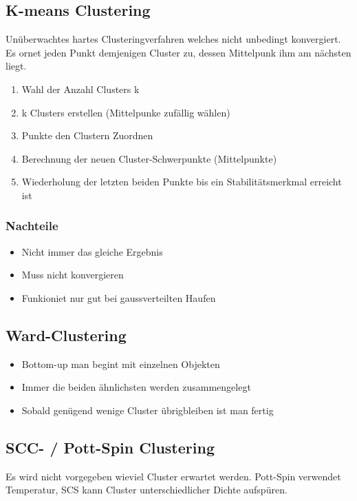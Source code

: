 \subsection{K-means Clustering}
Unüberwachtes hartes Clusteringverfahren welches nicht unbedingt konvergiert. Es ornet jeden Punkt demjenigen Cluster zu, dessen Mittelpunk ihm am nächsten liegt.
\begin{enumerate}
	\item Wahl der Anzahl Clusters k
	\item k Clusters erstellen (Mittelpunke zufällig wählen)
	\item Punkte den Clustern Zuordnen
	\item Berechnung der neuen Cluster-Schwerpunkte (Mittelpunkte)
	\item Wiederholung der letzten beiden Punkte bis ein Stabilitätsmerkmal erreicht ist
\end{enumerate}

\subsubsection{Nachteile}
\begin{itemize}
	\item Nicht immer das gleiche Ergebnis
	\item Muss nicht konvergieren
	\item Funkioniet nur gut bei gaussverteilten Haufen
\end{itemize}

\subsection{Ward-Clustering}
\begin{itemize}
	\item Bottom-up man begint mit einzelnen Objekten
	\item Immer die beiden ähnlichsten werden zusammengelegt
	\item Sobald genügend wenige Cluster übrigbleiben ist man fertig
\end{itemize}

\subsection{SCC- / Pott-Spin Clustering}
Es wird nicht vorgegeben wieviel Cluster erwartet werden. Pott-Spin verwendet Temperatur, SCS kann Cluster unterschiedlicher Dichte aufspüren.

